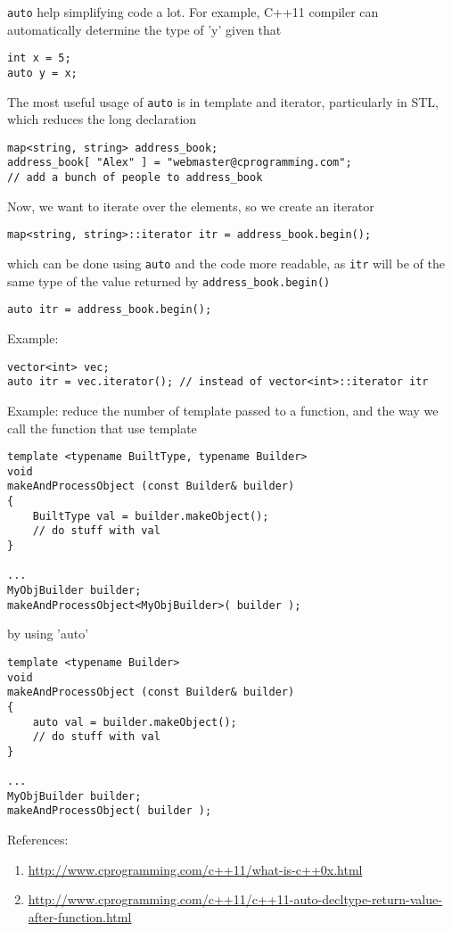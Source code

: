 \verb!auto! help simplifying code a lot. For example, C++11 compiler can
automatically determine the type of 'y' given that
\begin{lstlisting}
int x = 5;
auto y = x;
\end{lstlisting}

The most useful usage of \verb!auto! is in template and iterator, particularly
in STL, which reduces the long declaration 
\begin{lstlisting}
map<string, string> address_book;
address_book[ "Alex" ] = "webmaster@cprogramming.com";
// add a bunch of people to address_book
\end{lstlisting}
Now, we want to iterate over the elements, so we create an iterator
\begin{verbatim}
map<string, string>::iterator itr = address_book.begin();
\end{verbatim}
which can be done using \verb!auto! and the code more readable, as \verb!itr!
will be of the same type of the value returned by \verb!address_book.begin()!
\begin{lstlisting}
auto itr = address_book.begin();
\end{lstlisting}

Example:
\begin{lstlisting}
vector<int> vec;
auto itr = vec.iterator(); // instead of vector<int>::iterator itr
\end{lstlisting}

Example: reduce the number of template passed to a function, and the way we call
the function that use template
\begin{verbatim}
template <typename BuiltType, typename Builder>
void
makeAndProcessObject (const Builder& builder)
{
    BuiltType val = builder.makeObject();
    // do stuff with val
}

...
MyObjBuilder builder;
makeAndProcessObject<MyObjBuilder>( builder );
\end{verbatim}
by using 'auto'
\begin{lstlisting}
template <typename Builder>
void
makeAndProcessObject (const Builder& builder)
{
    auto val = builder.makeObject();
    // do stuff with val
}

...
MyObjBuilder builder;
makeAndProcessObject( builder );
\end{lstlisting}



References:
\begin{enumerate}
  \item \url{http://www.cprogramming.com/c++11/what-is-c++0x.html}
  \item
  \url{http://www.cprogramming.com/c++11/c++11-auto-decltype-return-value-after-function.html}
\end{enumerate}

